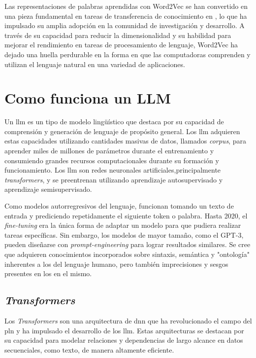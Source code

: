 Las representaciones de palabras aprendidas con Word2Vec se han convertido en una pieza fundamental en tareas de transferencia de conocimiento en , lo que ha impulsado su amplia adopción en la comunidad de investigación y desarrollo. A través de su capacidad para reducir la dimensionalidad y su habilidad para mejorar el rendimiento en tareas de procesamiento de lenguaje, Word2Vec ha dejado una huella perdurable en la forma en que las computadoras comprenden y utilizan el lenguaje natural en una variedad de aplicaciones.



\section{Como funciona un LLM}

Un \acrfull{llm} es un tipo de modelo lingüístico que destaca por su capacidad de comprensión y generación de lenguaje de propósito general. Los \acrshort{llm} adquieren estas capacidades utilizando cantidades masivas de datos, llamados \textit{corpus}, para aprender miles de millones de parámetros durante el entrenamiento y consumiendo grandes recursos computacionales durante su formación y funcionamiento\cite{radford_language_2019}. Los \acrshort{llm} son redes neuronales artificiales,principalmente \textit{transformers}\cite{Nvidia_Transformers}, y se preentrenan utilizando aprendizaje autosupervisado y aprendizaje semisupervisado.

Como modelos autorregresivos del lenguaje, funcionan tomando un texto de entrada y prediciendo repetidamente el siguiente token o palabra\cite{bowman2023eight}. Hasta 2020, el \textit{fine-tuning} era la única forma de adaptar un modelo para que pudiera realizar tareas específicas. Sin embargo, los modelos de mayor tamaño, como el GPT-3, pueden diseñarse con \textit{prompt-engineering} para lograr resultados similares. Se cree que adquieren conocimientos incorporados sobre sintaxis, semántica y "ontología" inherentes a los del lenguaje humano, pero también imprecisiones y sesgos presentes en los en el mismo.

\subsection{\textit{Transformers}}

Los \textit{Transformers} son una arquitectura de \acrfull{dnn} que ha revolucionado el campo del \acrfull{pln} y ha impulsado el desarrollo de los \acrfull{llm}. Estas arquitecturas se destacan por su capacidad para modelar relaciones y dependencias de largo alcance en datos secuenciales, como texto, de manera altamente eficiente\cite{Nvidia_Transformers}.


